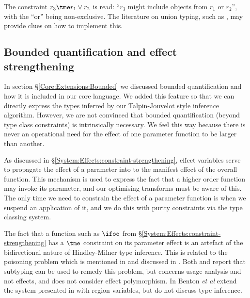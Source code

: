 The constraint $r_3 \tme r_1 \lor r_2$ is read: ``$r_3$ might include objects from $r_1$ or $r_2$'', with the ``or'' being non-exclusive. The literature on union typing, such as \cite{dunfield:intersections-and-unions}, may provide clues on how to implement this.

\subsection{Bounded quantification and effect strengthening}

In section \S\ref{Core:Extensions:Bounded} we discussed bounded quantification and how it is included in our core language. We added this feature so that we can directly express the types inferred by our Talpin-Jouvelot style inference algorithm. However, we are not convinced that bounded quantification (beyond type class constraints) is intrinsically necessary. We feel this way because there is never an operational need for the effect of one parameter function to be larger than another.

As discussed in \S\ref{System:Effects:constraint-strengthening}, effect variables serve to propagate the effect of a parameter into to the manifest effect of the overall function. This mechanism is used to express the fact that a higher order function may invoke its parameter, and our optimising transforms must be aware of this. The only time we need to constrain the effect of a parameter function is when we suspend an application of it, and we do this with purity constraints via the type classing system.

The fact that a function such as $\ifoo$ from \S\ref{System:Effects:constraint-strengthening} has a $\tme$ constraint on its parameter effect is an artefact of the bidirectional nature of Hindley-Milner type inference. This is related to the poisoning problem which is mentioned in \cite{benton:monads-effects-transformations} and discussed in \cite{wansbrough:once-upon-a-polymorphic-type}. Both \cite{wansbrough:once-upon-a-polymorphic-type} and \cite{benton:monads-effects-transformations} report that subtyping can be used to remedy this problem, but \cite{wansbrough:once-upon-a-polymorphic-type} concerns usage analysis and not effects, and \cite{benton:monads-effects-transformations} does not consider effect polymorphism. In \cite{benton:relational-semantics-effect-transformations} Benton \emph{et al} extend the system presented in \cite{benton:monads-effects-transformations} with region variables, but do not discuss type inference.

